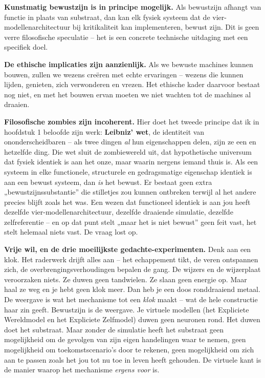 \documentclass[11pt, twoside, openright]{book}
\begin{document}
\textbf{Kunstmatig bewustzijn is in principe mogelijk.} Als bewustzijn afhangt van functie in plaats van substraat, dan kan elk fysiek systeem dat de vier-modellenarchitectuur bij kritikaliteit kan implementeren, bewust zijn. Dit is geen verre filosofische speculatie -- het is een concrete technische uitdaging met een specifiek doel.

\textbf{De ethische implicaties zijn aanzienlijk.} Als we bewuste machines kunnen bouwen, zullen we wezens creëren met echte ervaringen -- wezens die kunnen lijden, genieten, zich verwonderen en vrezen. Het ethische kader daarvoor bestaat nog niet, en met het bouwen ervan moeten we niet wachten tot de machines al draaien.

\textbf{Filosofische zombies zijn incoherent.} Hier doet het tweede principe dat ik in hoofdstuk 1 beloofde zijn werk: \textbf{Leibniz’ wet}, de identiteit van ononderscheidbaren -- als twee dingen \textit{al} hun eigenschappen delen, zijn ze een en hetzelfde ding. Die wet sluit de zombiewereld uit, dat hypothetische universum dat fysiek identiek is aan het onze, maar waarin nergens iemand thuis is. Als een systeem in elke functionele, structurele en gedragsmatige eigenschap identiek is aan een bewust systeem, dan \textit{is} het bewust. Er bestaat geen extra „bewustzijnssubstantie” die stilletjes zou kunnen ontbreken terwijl al het andere precies blijft zoals het was. Een wezen dat functioneel identiek is aan jou heeft dezelfde vier-modellenarchitectuur, dezelfde draaiende simulatie, dezelfde zelfreferentie -- en op dat punt stelt „maar het is niet bewust” geen feit vast, het stelt helemaal niets vast. De vraag lost op.

\textbf{Vrije wil, en de drie moeilijkste gedachte-experimenten.} Denk aan een klok. Het raderwerk drijft alles aan -- het echappement tikt, de veren ontspannen zich, de overbrengingsverhoudingen bepalen de gang. De wijzers en de wijzerplaat veroorzaken niets. Ze duwen geen tandwielen. Ze slaan geen energie op. Maar haal ze weg en je hebt geen klok meer. Dan heb je een doos ronddraaiend metaal. De weergave is wat het mechanisme tot een \textit{klok} maakt -- wat de hele constructie haar zin geeft. Bewustzijn is de weergave. Je virtuele modellen (het Expliciete Wereldmodel en het Expliciete Zelfmodel) duwen geen neuronen rond. Het duwen doet het substraat. Maar zonder de simulatie heeft het substraat geen mogelijkheid om de gevolgen van zijn eigen handelingen waar te nemen, geen mogelijkheid om toekomstscenario’s door te rekenen, geen mogelijkheid om zich aan te passen zoals het jou tot nu toe in leven heeft gehouden. De virtuele kant is de manier waarop het mechanisme \textit{ergens voor} is.
\end{document}
